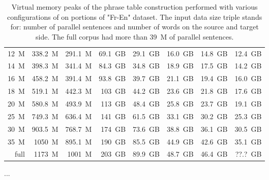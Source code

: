 \begin{table}[ht]
\begin{tabular}{ | r | r | r | r | r | r | r | r | }
\hline
12~M & 338.2~M & 291.1~M & 69.1~GB & 29.1~GB & 16.0~GB & 14.8~GB & 12.4~GB \\
14~M & 398.3~M & 341.4~M & 84.3~GB & 34.8~GB & 18.9~GB & 17.5~GB & 14.2~GB \\
16~M & 458.2~M & 391.4~M & 93.8~GB & 39.7~GB & 21.1~GB & 19.4~GB & 16.0~GB \\
18~M & 519.1~M & 442.3~M & 103~GB & 44.2~GB & 23.6~GB & 21.8~GB & 17.6~GB \\
20~M & 580.8~M & 493.9~M & 113~GB & 48.4~GB & 25.8~GB & 23.7~GB & 19.1~GB \\
\hline
25~M & 749.3~M & 636.4~M & 141~GB & 61.5~GB & 33.1~GB & 30.2~GB & 25.3~GB \\
30~M & 903.5~M & 768.7~M & 174~GB & 73.6~GB & 38.8~GB & 36.1~GB & 30.5~GB \\
35~M & 1050~M & 895.1~M & 190~GB & 85.5~GB & 44.9~GB & 42.6~GB & 35.1~GB \\
full & 1173~M & 1001~M & 203~GB & 89.9~GB & 48.7~GB & 46.4~GB & ??.?~GB \\ %
\hline
\end{tabular}
\caption{\label{fr-en-memory-benchmarking}
Virtual memory peaks of the phrase table construction performed with
various configurations of \eppex{} on portions of "Fr-En" dataset.
The input data size triple stands for: number of parallel sentences and number of words on the source and target side.
The full corpus had more than 39~M of parallel sentences.}
\end{table}

...

